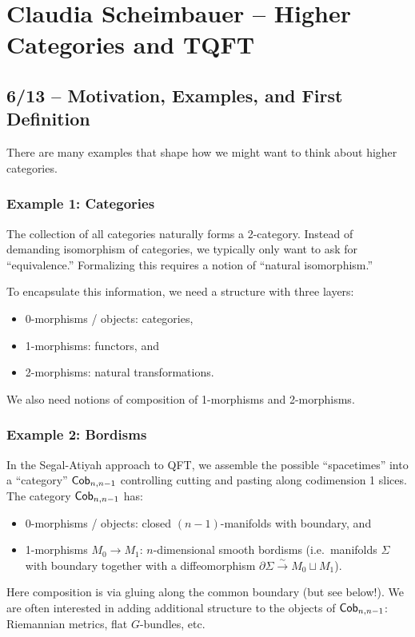 \chapter{Claudia Scheimbauer -- Higher Categories and TQFT}

\section{6/13 -- Motivation, Examples, and First Definition}

There are many examples that shape how we might want to think about higher categories.

\subsection{Example 1: Categories}

The collection of all categories naturally forms a 2-category.
Instead of demanding isomorphism of categories, we typically only want to ask for ``equivalence.''
Formalizing this requires a notion of ``natural isomorphism.''

To encapsulate this information, we need a structure with three layers:
\begin{itemize}
	\item 0-morphisms / objects: categories,
	\item 1-morphisms: functors, and
	\item 2-morphisms: natural transformations.
\end{itemize}
We also need notions of composition of 1-morphisms and 2-morphisms.

\subsection{Example 2: Bordisms}

In the Segal-Atiyah approach to QFT, we assemble the possible ``spacetimes'' into a ``category'' $\mathsf{Cob}_{n,n-1}$ controlling cutting and pasting along codimension 1 slices.
The category $\mathsf{Cob}_{n,n-1}$ has:
\begin{itemize}
	\item 0-morphisms / objects: closed $(n-1)$-manifolds with boundary, and
	\item 1-morphisms $M_0 \to M_1$: $n$-dimensional smooth bordisms (i.e.\ manifolds $\Sigma$ with boundary together with a diffeomorphism $\partial \Sigma \xrightarrow{\sim} M_0 \sqcup M_1$).
\end{itemize}
Here composition is via gluing along the common boundary (but see below!).
We are often interested in adding additional structure to the objects of $\mathsf{Cob}_{n,n-1}$: Riemannian metrics, flat $G$-bundles, etc.

